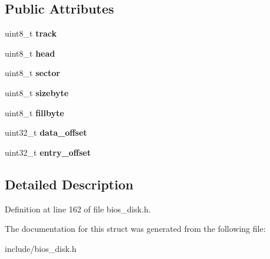 \subsection*{Public Attributes}
\begin{DoxyCompactItemize}
\item 
\hypertarget{structimageDiskVFD_1_1vfdentry_a584716a3b21efbb6fb92e6d4a9fd30bf}{uint8\-\_\-t {\bfseries track}}\label{structimageDiskVFD_1_1vfdentry_a584716a3b21efbb6fb92e6d4a9fd30bf}

\item 
\hypertarget{structimageDiskVFD_1_1vfdentry_a4a98505e2f0be19cf7a7a6df5e5ea4a8}{uint8\-\_\-t {\bfseries head}}\label{structimageDiskVFD_1_1vfdentry_a4a98505e2f0be19cf7a7a6df5e5ea4a8}

\item 
\hypertarget{structimageDiskVFD_1_1vfdentry_ab2db645ccdbcbc76267db774f486b972}{uint8\-\_\-t {\bfseries sector}}\label{structimageDiskVFD_1_1vfdentry_ab2db645ccdbcbc76267db774f486b972}

\item 
\hypertarget{structimageDiskVFD_1_1vfdentry_a1f299aea35eccb67232f2f72eb3472b1}{uint8\-\_\-t {\bfseries sizebyte}}\label{structimageDiskVFD_1_1vfdentry_a1f299aea35eccb67232f2f72eb3472b1}

\item 
\hypertarget{structimageDiskVFD_1_1vfdentry_a7bb993c2cfaef8d5b06749015f821986}{uint8\-\_\-t {\bfseries fillbyte}}\label{structimageDiskVFD_1_1vfdentry_a7bb993c2cfaef8d5b06749015f821986}

\item 
\hypertarget{structimageDiskVFD_1_1vfdentry_ae3f61135f4078782c64c798ca905b9df}{uint32\-\_\-t {\bfseries data\-\_\-offset}}\label{structimageDiskVFD_1_1vfdentry_ae3f61135f4078782c64c798ca905b9df}

\item 
\hypertarget{structimageDiskVFD_1_1vfdentry_ac9240537467abe687506ac21be081991}{uint32\-\_\-t {\bfseries entry\-\_\-offset}}\label{structimageDiskVFD_1_1vfdentry_ac9240537467abe687506ac21be081991}

\end{DoxyCompactItemize}


\subsection{Detailed Description}


Definition at line 162 of file bios\-\_\-disk.\-h.



The documentation for this struct was generated from the following file\-:\begin{DoxyCompactItemize}
\item 
include/bios\-\_\-disk.\-h\end{DoxyCompactItemize}
